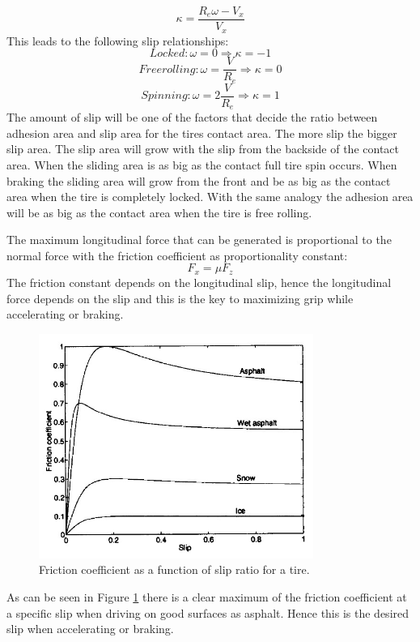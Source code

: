 \begin{equation}
\kappa = \dfrac{R_{e}\omega-V_{x}}{V_{x}}
\label{eq:longslip}
\end{equation}
This leads to the following slip relationships:
\begin{equation}
Locked: \omega = 0 \Rightarrow \kappa = -1
\end{equation}
\begin{equation}
Free rolling: \omega = \frac{V}{R_{e}} \Rightarrow \kappa = 0
\end{equation}
\begin{equation}
Spinning: \omega = 2\frac{V}{R_{e}} \Rightarrow \kappa = 1
\end{equation}
The amount of slip will be one of the factors that decide the ratio between adhesion area and slip area for the tires contact area. The more slip the bigger slip area. The slip area will grow with the slip from the backside of the contact area. When the sliding area is as big as the contact full tire spin occurs. When braking the sliding area will grow from the front and be as big as the contact area when the tire is completely locked. With the same analogy the adhesion area will be as big as the contact area when the tire is free rolling. 

The maximum longitudinal force that can be generated is proportional to the normal force with the friction coefficient as proportionality constant:
\begin{equation}
F_{x} =  \mu F_{z}
\label{eq:fxmufz}
\end{equation}
The friction constant depends on the longitudinal slip, hence the longitudinal force depends on the slip and this is the key to maximizing grip while accelerating or braking.
\begin{figure}[h]
	\centering
	\includegraphics[width=0.8\textwidth]{Pictures/fric_slip}
	\caption{Friction coefficient as a function of slip ratio for a tire. \cite{gustafsson1997}}
	\label{fric_slip}
\end{figure}
As can be seen in Figure \ref{fric_slip} there is a clear maximum of the friction coefficient at a specific slip when driving on good surfaces as asphalt. Hence this is the desired slip when accelerating or braking.

